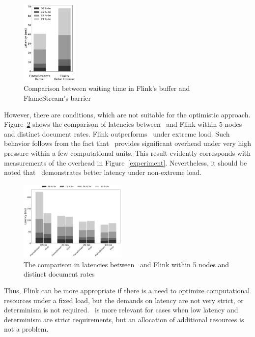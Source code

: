 \begin{figure}[htbp]
  \centering
  \includegraphics[width=0.25\textwidth]{pics/buffer-vs-barrier}
  \caption{Comparison between waiting time in Flink's buffer and FlameStream's barrier}
  \label {buffer-vs-barrier}
\end{figure}

However, there are conditions, which are not suitable for the optimistic approach. Figure~\ref{fs-index-quantiles-5} shows the comparison of latencies between \FlameStream\ and Flink within 5 nodes and distinct document rates. Flink outperforms \FlameStream\ under extreme load. Such behavior follows from the fact that \FlameStream\ provides significant overhead under very high pressure within a few computational units. This result evidently corresponds with measurements of the overhead in Figure~\ref{experiment}. Nevertheless, it should be noted that \FlameStream\ demonstrates better latency under non-extreme load.

\begin{figure}[htbp]
  \centering
  \includegraphics[width=0.47\textwidth]{pics/comp-index-quantiles_5}
  \caption{The comparison in latencies between \FlameStream\ and Flink within 5 nodes and distinct document rates}
  \label {fs-index-quantiles-5}
\end{figure}

Thus, Flink can be more appropriate if there is a need to optimize computational resources under a fixed load, but the demands on latency are not very strict, or determinism is not required. \FlameStream\ is more relevant for cases when low latency and determinism are strict requirements, but an allocation of additional resources is not a problem.  

